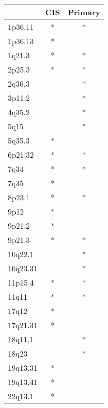 \begin{tabular}{lcc}
\toprule
{} & CIS & Primary \\
\midrule
1p36.11  &   * &       * \\
1p36.13  &   * &         \\
1q21.3   &   * &       * \\
2p25.3   &   * &       * \\
2q36.3   &     &       * \\
3p11.2   &     &       * \\
4q35.2   &     &       * \\
5q15     &     &       * \\
5q35.3   &   * &         \\
6p21.32  &   * &       * \\
7q34     &   * &       * \\
7q35     &   * &         \\
8p23.1   &   * &       * \\
9p12     &   * &         \\
9p21.2   &   * &         \\
9p21.3   &   * &       * \\
10q22.1  &     &       * \\
10q23.31 &     &       * \\
11p15.4  &   * &       * \\
11q11    &   * &       * \\
17q12    &   * &         \\
17q21.31 &   * &         \\
18q11.1  &     &       * \\
18q23    &     &       * \\
19q13.31 &   * &         \\
19q13.41 &   * &         \\
22q13.1  &   * &         \\
\bottomrule
\end{tabular}
